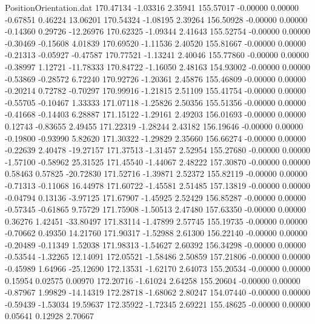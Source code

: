 \begin{filecontents}{PositionOrientation.dat}
 170.47134   -1.03316    2.35941   155.57017   -0.00000    0.00000   -0.67851    0.46224   13.06201
 170.54324   -1.08195    2.39264   156.50928   -0.00000    0.00000   -0.14360    0.29726  -12.26976
 170.62325   -1.09344    2.41643   155.52754   -0.00000    0.00000   -0.30469   -0.15608    4.01839
 170.69520   -1.11536    2.40520   155.81667   -0.00000    0.00000   -0.21313   -0.05927   -0.47587
 170.77521   -1.13241    2.40046   155.77860   -0.00000    0.00000   -0.38997    1.12721  -11.78333
 170.84722   -1.16050    2.48163   154.93002   -0.00000    0.00000   -0.53869   -0.28572    6.72240
 170.92726   -1.20361    2.45876   155.46809   -0.00000    0.00000   -0.20214    0.72782   -0.70297
 170.99916   -1.21815    2.51109   155.41754   -0.00000    0.00000   -0.55705   -0.10467    1.33333
 171.07118   -1.25826    2.50356   155.51356   -0.00000    0.00000   -0.41668   -0.14403    6.28887
 171.15122   -1.29161    2.49203   156.01693   -0.00000    0.00000    0.12743   -0.83655    2.49455
 171.22319   -1.28244    2.43182   156.19646   -0.00000    0.00000   -0.19800   -0.93990    5.82620
 171.30322   -1.29829    2.35660   156.66274   -0.00000    0.00000   -0.22639    2.40478  -19.27157
 171.37513   -1.31457    2.52954   155.27680   -0.00000    0.00000   -1.57100   -0.58962   25.31525
 171.45540   -1.44067    2.48222   157.30870   -0.00000    0.00000    0.58463    0.57825  -20.72830
 171.52716   -1.39871    2.52372   155.82119   -0.00000    0.00000   -0.71313   -0.11068   16.44978
 171.60722   -1.45581    2.51485   157.13819   -0.00000    0.00000   -0.04794    0.13136   -3.97125
 171.67907   -1.45925    2.52429   156.85287   -0.00000    0.00000   -0.57345   -0.61865    9.75729
 171.75908   -1.50513    2.47480   157.63350   -0.00000    0.00000    0.36276    1.42451  -33.80497
 171.83114   -1.47899    2.57745   155.19735   -0.00000    0.00000   -0.70662    0.49350   14.21760
 171.90317   -1.52988    2.61300   156.22140   -0.00000    0.00000   -0.20489   -0.11349    1.52038
 171.98313   -1.54627    2.60392   156.34298   -0.00000    0.00000   -0.53544   -1.32265   12.14091
 172.05521   -1.58486    2.50859   157.21806   -0.00000    0.00000   -0.45989    1.64966  -25.12690
 172.13531   -1.62170    2.64073   155.20534   -0.00000    0.00000    0.15954    0.02575    0.00970
 172.20716   -1.61024    2.64258   155.20604   -0.00000    0.00000   -0.87967    1.99829  -14.14319
 172.28718   -1.68062    2.80247   154.07440   -0.00000    0.00000   -0.59439   -1.53034   19.59637
 172.35922   -1.72345    2.69221   155.48625   -0.00000    0.00000    0.05641    0.12928    2.70667

\end{filecontents}
